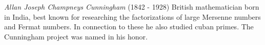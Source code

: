 \documentclass[12pt]{article}
\begin{document}
\emph{Allan Joseph Champneys Cunningham} (1842 - 1928) British mathematician born in India, best known for researching the factorizations of large Mersenne numbers and Fermat numbers. In connection to these he also studied cuban primes. The Cunningham project was named in his honor.
\end{document}
